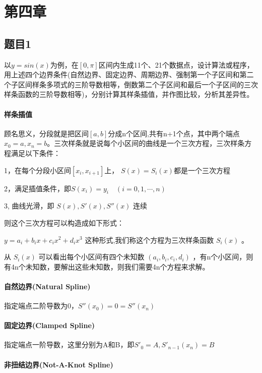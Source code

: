 \section{第四章}



\subsection{题目1}

以$y=sin(x)$为例，在$[0,\pi]$区间内生成11个、21个数据点，设计算法或程序，用上述四个边界条件(自然边界、固定边界、周期边界、强制第一个子区间和第二个子区间样条多项式的三阶导数相等，倒数第二个子区间和最后一个子区间的三次样条函数的三阶导数相等)，分别计算其样条插值，并作图比较，分析其差异性。

\paragraph{样条插值}

顾名思义，分段就是把区间$[a,b]$分成n个区间,共有n+1个点，其中两个端点$x_0=a,x_n=b$。三次样条就是说每个小区间的曲线是一个三次方程，三次样条方程满足以下条件：

1，在每个分段小区间$[x_i,x_{i+1}]$上， $S(x)=S_i(x)$都是一个三次方程

2，满足插值条件，即$S(x_i)=y_i \quad (i=0,1,\cdots ,n)$

3, 曲线光滑，即 $S(x),S'(x),S''(x)$ 连续

则这个三次方程可以构造成如下形式：

$y=a_i+b_i x+c_i x^2+d_i x^3$ 这种形式,我们称这个方程为三次样条函数 $S_i(x)$ 。

从 $S_i(x)$ 可以看出每个小区间有四个未知数 $(a_i,b_i,c_i,d_i)$ ，有n个小区间，则有4n个未知数，要解出这些未知数，则我们需要4n个方程来求解。

\paragraph{自然边界(Natural Spline)}

指定端点二阶导数为0，$S''(x_0)=0=S''(x_n)$


\paragraph{固定边界(Clamped Spline)}

指定端点一阶导数，这里分别为A和B，即$S'_0=A, S'_{n-1}(x_n)=B$

\paragraph{非扭结边界(Not-A-Knot Spline)}

